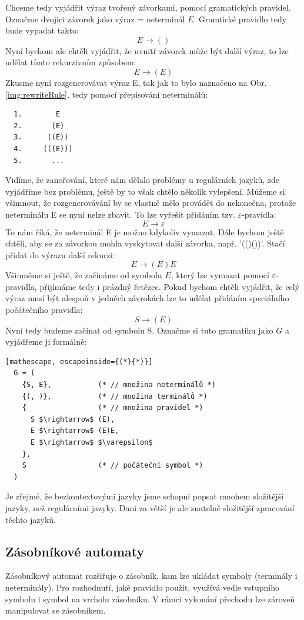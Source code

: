 Chceme tedy vyjádřit výraz tvořený závorkami, pomocí gramatických pravidel.
Označme dvojici závorek jako výraz = neterminál $E$. Gramtické pravidlo tedy bude
vypadat takto:
\[E \rightarrow ()\]
Nyní bychom ale chtěli vyjádřit, že uvnitř závorek může být další výraz, to
lze udělat tímto rekurzivním způsobem:
\[E \rightarrow (E)\]
Zkusme nyní rozgenerovávat výraz E, tak jak to bylo naznačeno na Obr. \ref{img:rewriteRule},
tedy pomocí přepisování neterminálů:
\begin{lstlisting}
  1.        E
  2.       (E)
  3.      ((E))
  4.     (((E)))
  5.       ...
\end{lstlisting}
Vidíme, že zanořování, které nám dělalo problémy u regulárních jazyků, zde vyjádříme bez problému,
ještě by to však chtělo několik vylepšení.
Můžeme si všimnout, že rozgenerovávání by se vlastně mělo provádět do nekonečna,
protože neterminálu E se nyní nelze zbavit. To lze vyřešit přidáním tzv.
$\varepsilon$-pravidla:
\[E \rightarrow \varepsilon\]
To nám říká, že neterminál E je možno kdykoliv vymazat. Dále bychom ještě chtěli,
aby se za závorkou mohla vyskytovat další závorka, např. '(()())'.
Stačí přidat do výrazu další rekurzi:
\[E \rightarrow (E)E\]
Všimněme si ještě, že začínáme od symbolu $E$, který lze vymazat pomocí
$\varepsilon$-pravidla, přijímáme tedy i prázdný řetězec. Pokud bychom chtěli
vyjádřit, že celý výraz musí být alespoň v jedněch závrokách lze to udělat
přidáním speciálního počátečního pravidla:
\[S \rightarrow (E)\]
Nyní tedy budeme začínat od symbolu S. Označme si tuto gramatiku jako
$G$ a vyjádřeme ji formálně:
\begin{lstlisting}[mathescape, escapeinside={(*}{*)}]
  G = (
    {S, E},           (* // množina neterminálů *)
    {(, )},           (* // množina terminálů *)
    {                 (* // množina pravidel *)
      S $\rightarrow$ (E),
      E $\rightarrow$ (E)E,
      E $\rightarrow$ $\varepsilon$
    },
    S                 (* // počáteční symbol *)
  )
\end{lstlisting}

Je zřejmé, že bezkontextovými jazyky jsme schopni popsat mnohem
složitější jazyky, než regulárními jazyky. Daní za větší 
je ale znatelně složitější zpracování těchto jazyků.

\subsection{Zásobníkové automaty}

Zásobníkový automat rozšiřuje  o zásobník, kam lze
ukládat symboly (terminály i neterminály). Pro rozhodnutí, jaké pravidlo použít,
využívá vedle vstupního symbolu i symbol na vrcholu zásobníku. V rámci vykonání
přechodu lze zároveň manipulovat se zásobníkem.\\


